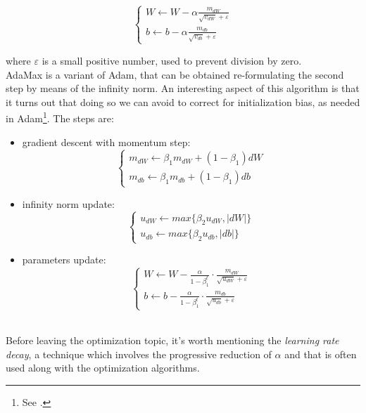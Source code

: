 \documentclass[12pt, a4paper]{report}
\theoremstyle{definition}
\begin{document}
{\begin{itemize}
\begin{equation*}
\begin{cases}
	W\longleftarrow W - \alpha \frac{m_{dW}}{\sqrt{v_{dW}}+\varepsilon}\\
	b\longleftarrow b - \alpha \frac{m_{db}}{\sqrt{v_{db}}+\varepsilon}
	\end{cases}
	\end{equation*}
\end{itemize}
where $\varepsilon$ is a small positive number, used to prevent division by zero.\\
\newline \noindent AdaMax is a variant of Adam, that can be obtained re-formulating the second step by means of the infinity norm. An interesting aspect of this algorithm is that it turns out that doing so we can avoid to correct for initialization bias, as needed in Adam\footnote{See \cite{Kingma}.}. The steps are:
\begin{itemize}\label{AdaMax}
	\item gradient descent with momentum step:
	\begin{equation*}
	\begin{cases}
	m_{dW}\longleftarrow\beta_1 m_{dW} + (1-\beta_1) dW\\
	m_{db}\longleftarrow\beta_1 m_{db} + (1-\beta_1) db
	\end{cases}
	\end{equation*}
	\item infinity norm update:
	\begin{equation*}
	\begin{cases}
	u_{dW}\longleftarrow max\{\beta_2 u_{dW}, |dW| \}\\
	u_{db}\longleftarrow max\{\beta_2 u_{db}, |db| \}
	\end{cases}
	\end{equation*}
	\item parameters update:
	\begin{equation*}
	\begin{cases}
	W\longleftarrow W - \frac{\alpha}{1-\beta_1^t}\cdot \frac{m_{dW}}{\sqrt{u_{dW}}+\varepsilon}\\
	b\longleftarrow b - \frac{\alpha}{1-\beta_1^t}\cdot \frac{m_{db}}{\sqrt{u_{db}}+\varepsilon}
	\end{cases}
	\end{equation*}
\end{itemize}
\noindent \\Before leaving the optimization topic, it's worth mentioning the \textit{learning rate decay}, a technique which involves the progressive reduction of $\alpha$ and that is often used along with the optimization algorithms.\\
}
\end{document}
